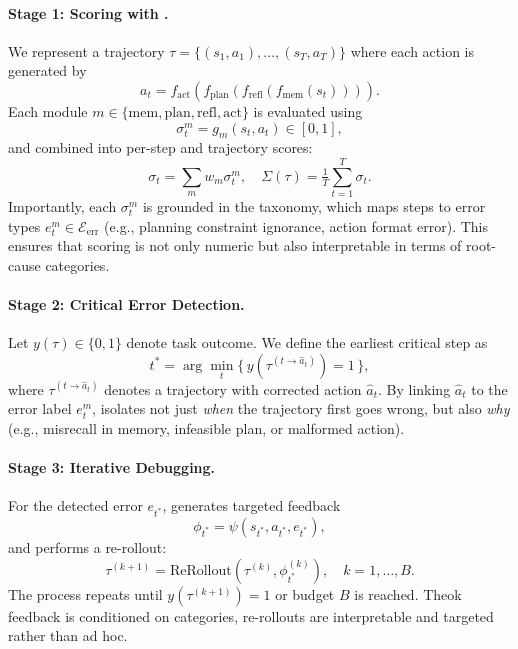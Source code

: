 \paragraph{Stage 1: Scoring with \AET{}.}  
We represent a trajectory $\tau=\{(s_1,a_1),\dots,(s_T,a_T)\}$ where each action is generated by  
\begin{equation}
    a_t = f_{\text{act}}(f_{\text{plan}}(f_{\text{refl}}(f_{\text{mem}}(s_t)))).
\end{equation}
Each module $m \in \{\text{mem},\text{plan},\text{refl},\text{act}\}$ is evaluated using  
\begin{equation}
    \sigma_t^m = g_m(s_t,a_t)\in[0,1],
\end{equation}
and combined into per-step and trajectory scores:  
\begin{equation}
    \sigma_t = \sum_m w_m\sigma_t^m, 
    \quad \Sigma(\tau)=\tfrac{1}{T}\sum_{t=1}^T\sigma_t.
\end{equation}
Importantly, each $\sigma_t^m$ is grounded in the \AET{} taxonomy, which maps steps to error types $e_t^m \in \mathcal{E}_{\text{err}}$ (e.g., planning constraint ignorance, action format error). This ensures that scoring is not only numeric but also interpretable in terms of root-cause categories.  

\paragraph{Stage 2: Critical Error Detection.}  
Let $y(\tau)\in\{0,1\}$ denote task outcome. We define the earliest critical step as  
\begin{equation}
    t^\ast = \arg\min_{t} \{\, y(\tau^{(t \to \hat{a}_t)})=1 \,\},
\end{equation}
where $\tau^{(t \to \hat{a}_t)}$ denotes a trajectory with corrected action $\hat{a}_t$. By linking $\hat{a}_t$ to the \AET{} error label $e_t^m$, \ModelName{} isolates not just \emph{when} the trajectory first goes wrong, but also \emph{why} (e.g., misrecall in memory, infeasible plan, or malformed action).  

\paragraph{Stage 3: Iterative Debugging.}  
For the detected error $e_{t^\ast}$, \ModelName{} generates targeted feedback
\begin{equation}
    \phi_{t^\ast} = \psi(s_{t^\ast},a_{t^\ast},e_{t^\ast}),
\end{equation}
and performs a re-rollout:
\begin{equation}
    \tau^{(k+1)} = \text{ReRollout}(\tau^{(k)},\phi_{t^\ast}^{(k)}), \quad k=1,\dots,B.
\end{equation}
The process repeats until $y(\tau^{(k+1)})=1$ or budget $B$ is reached. Theok feedback is conditioned on \AET{} categories, re-rollouts are interpretable and targeted rather than ad hoc.  


